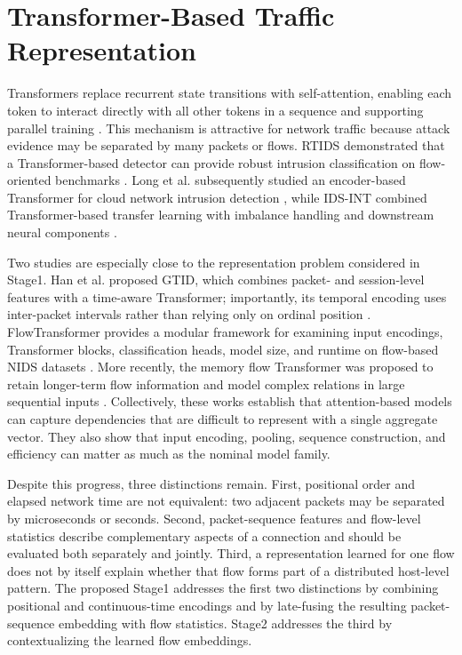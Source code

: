 \documentclass[11pt,fleqn]{report}
\begin{document}
\section{Transformer-Based Traffic Representation}
\label{subsec:rw_transformers}

Transformers replace recurrent state transitions with self-attention, enabling each token to interact directly with all other tokens in a sequence and supporting parallel training \cite{Vaswani2017}. This mechanism is attractive for network traffic because attack evidence may be separated by many packets or flows. RTIDS demonstrated that a Transformer-based detector can provide robust intrusion classification on flow-oriented benchmarks \cite{Wu2022RTIDS}. Long et al. subsequently studied an encoder-based Transformer for cloud network intrusion detection
\cite{Long2024TransformerNIDS}, while IDS-INT combined Transformer-based transfer learning with imbalance handling and downstream neural components \cite{Ullah2024IDSINT}.

Two studies are especially close to the representation problem considered in Stage1. Han et al. proposed GTID, which combines packet- and session-level features with a time-aware Transformer; importantly, its temporal encoding uses inter-packet intervals rather than relying only on ordinal position \cite{Han2023GTID}. FlowTransformer provides a modular framework for examining input encodings, Transformer blocks, classification heads, model size, and runtime on flow-based NIDS datasets \cite{Manocchio2024FlowTransformer}. More recently, the memory flow Transformer was proposed to retain longer-term flow information and model complex relations in large sequential inputs \cite{Jiang2025MFT}. Collectively, these works establish that attention-based models can capture dependencies that are difficult to represent with a single aggregate vector. They also show that input encoding, pooling, sequence construction, and efficiency can matter as much as the nominal model family.

Despite this progress, three distinctions remain. First, positional order and elapsed network time are not equivalent: two adjacent packets may be separated by microseconds or seconds. Second, packet-sequence features and flow-level statistics describe complementary aspects of a connection and should be evaluated both separately and jointly. Third, a representation learned for one flow does not by itself explain whether that flow forms part of a distributed host-level pattern. The proposed Stage1 addresses the first two distinctions by combining positional and continuous-time encodings and by late-fusing the resulting packet-sequence embedding with flow statistics. Stage2 addresses the third by contextualizing the learned flow embeddings.
\end{document}
